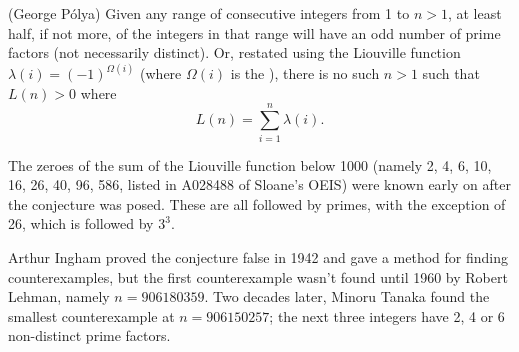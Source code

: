 \documentclass[12pt]{article}
\begin{document}
(George P\'olya) Given any range of consecutive integers from 1 to $n > 1$, at least half, if not more, of the integers in that range will have an odd number of prime factors (not necessarily distinct). Or, restated using the Liouville function $\lambda(i) = (-1)^{\Omega(i)}$ (where $\Omega(i)$ is the ), there is no such $n > 1$ such that $L(n) > 0$ where $$L(n) = \sum_{i = 1}^n \lambda(i).$$

The zeroes of the sum of the Liouville function below 1000 (namely 2, 4, 6, 10, 16, 26, 40, 96, 586, listed in A028488 of Sloane's OEIS) were known early on after the conjecture was posed. These are all followed by primes, with the exception of 26, which is followed by $3^3$.

Arthur Ingham proved the conjecture false in 1942 and gave a method for finding counterexamples, but the first counterexample wasn't found until 1960 by Robert Lehman, namely $n = 906180359$. Two decades later, Minoru Tanaka found the smallest counterexample at $n = 906150257$; the next three integers have 2, 4 or 6 non-distinct prime factors.
\end{document}
